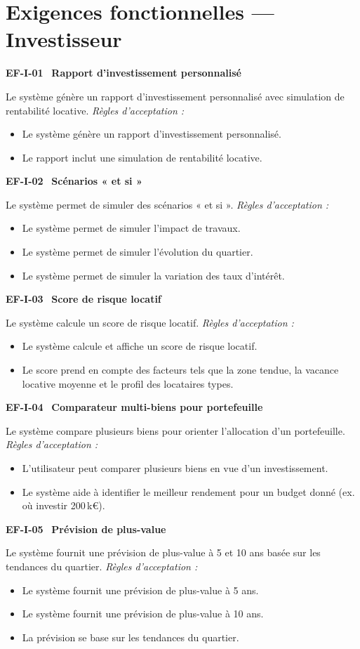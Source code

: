 \documentclass[11pt,a4paper]{article}
\newcommand{\exigence}[2]{%
  \par\vspace{6pt}%
  \noindent\colorbox{light}{%
    \parbox{\dimexpr\textwidth-2\fboxsep}{%
      \textbf{\color{primary}#1} \textemdash\ \textbf{#2}%
    }%
  }\par\vspace{2pt}%
}
\newenvironment{acceptation}
  {\vspace{2pt}\noindent\textit{Règles d'acceptation :}
   \begin{itemize}[leftmargin=1.4em,itemsep=1pt,topsep=2pt]}
  {\end{itemize}\vspace{4pt}}
\begin{document}
\section{Exigences fonctionnelles — Investisseur}

\exigence{EF-I-01}{Rapport d'investissement personnalisé}
Le système génère un rapport d'investissement personnalisé avec simulation de
rentabilité locative.
\begin{acceptation}
  \item Le système génère un rapport d'investissement personnalisé.
  \item Le rapport inclut une simulation de rentabilité locative.
\end{acceptation}

\exigence{EF-I-02}{Scénarios « et si »}
Le système permet de simuler des scénarios « et si ».
\begin{acceptation}
  \item Le système permet de simuler l'impact de travaux.
  \item Le système permet de simuler l'évolution du quartier.
  \item Le système permet de simuler la variation des taux d'intérêt.
\end{acceptation}

\exigence{EF-I-03}{Score de risque locatif}
Le système calcule un score de risque locatif.
\begin{acceptation}
  \item Le système calcule et affiche un score de risque locatif.
  \item Le score prend en compte des facteurs tels que la zone tendue, la vacance locative moyenne et le profil des locataires types.
\end{acceptation}

\exigence{EF-I-04}{Comparateur multi-biens pour portefeuille}
Le système compare plusieurs biens pour orienter l'allocation d'un
portefeuille.
\begin{acceptation}
  \item L'utilisateur peut comparer plusieurs biens en vue d'un investissement.
  \item Le système aide à identifier le meilleur rendement pour un budget donné (ex. où investir 200\,k\euro{}).
\end{acceptation}

\exigence{EF-I-05}{Prévision de plus-value}
Le système fournit une prévision de plus-value à 5 et 10 ans basée sur les
tendances du quartier.
\begin{acceptation}
  \item Le système fournit une prévision de plus-value à 5 ans.
  \item Le système fournit une prévision de plus-value à 10 ans.
  \item La prévision se base sur les tendances du quartier.
\end{acceptation}
\end{document}
